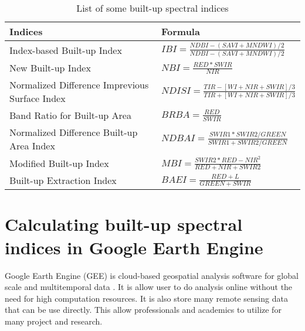 \begin{table}[htbp]
	\centering
	\caption{List of some built-up spectral indices}
	\begin{tabular}{ l  l }
		\hline

		\textbf{Indices} & \textbf{Formula} \\

		\hline

		Index-based Built-up Index & $IBI = \frac{NDBI - (SAVI + MNDWI)/2}{NDBI - (SAVI + MNDWI)/2}$ \\

		\hline
		
		New Built-up Index & $NBI = \frac{RED * SWIR}{NIR}$ \\

		\hline

		Normalized Difference Imprevious Surface Index & $NDISI = \frac{TIR - [WI + NIR + SWIR]/3}{TIR + [WI + NIR + SWIR]/3}$ \\

		\hline

		Band Ratio for Built-up Area & $BRBA = \frac{RED}{SWIR}$ \\

		\hline

		Normalized Difference Built-up Area Index & $NDBAI = \frac{SWIR1 * SWIR2 / GREEN}{SWIR1 + SWIR2 / GREEN}$ \\

		\hline
		
		Modified Built-up Index & $MBI = \frac{SWIR2 * RED - NIR^2}{RED + NIR + SWIR2}$ \\

		\hline

		Built-up Extraction Index & $BAEI = \frac{RED + L}{GREEN + SWIR}$ \\

		\hline
	\end{tabular}
	\label{table:urbanIndices}
\end{table}


\section{Calculating built-up spectral indices in Google Earth Engine}
Google Earth Engine (GEE) is cloud-based geospatial analysis software for global scale and multitemporal data \cite{gorelick2017google}. It is allow user to do analysis online without the need for high computation resources. It is also store many remote sensing data that can be use directly. This allow professionals and academics to utilize for many project and research.


